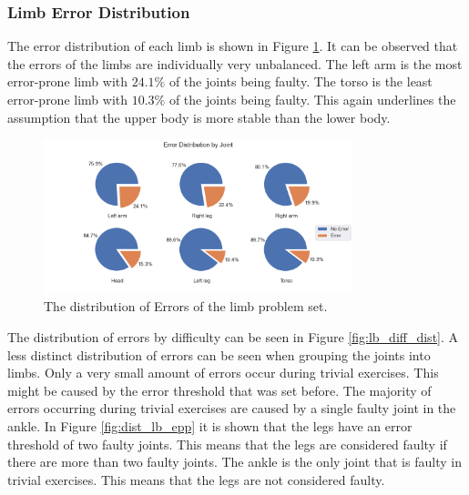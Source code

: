 \subsubsection{Limb Error Distribution}

The error distribution of each limb is shown in Figure \ref{fig:lb_pie}. It can be observed that the errors of the limbs are individually very unbalanced. The left arm is the most error-prone limb with $24.1\%$ of the joints being faulty. The torso is the least error-prone limb with $10.3\%$ of the joints being faulty. This again underlines the assumption that the upper body is more stable than the lower body.

\begin{figure}
  \centering
  \includegraphics[width=0.8\textwidth]{figures/Data/dist_limbs/Error_Distribution_by_Joint.png}
  \caption[Error Distribution by Limb]{The distribution of Errors of the limb problem set.}
  \label{fig:lb_pie}
\end{figure}

The distribution of errors by difficulty can be seen in Figure \ref{fig:lb_diff_dist}. A less distinct distribution of errors can be seen when grouping the joints into limbs. Only a very small amount of errors occur during trivial exercises. This might be caused by the error threshold that was set before. The majority of errors occurring during trivial exercises are caused by a single faulty joint in the ankle. In Figure \ref{fig:dist_lb_epp} it is shown that the legs have an error threshold of two faulty joints. This means that the legs are considered faulty if there are more than two faulty joints. The ankle is the only joint that is faulty in trivial exercises. This means that the legs are not considered faulty.

